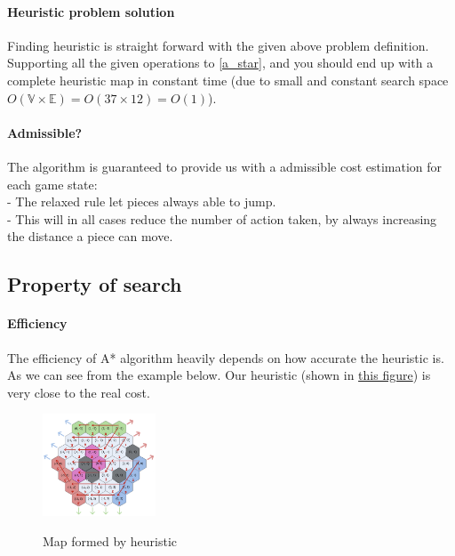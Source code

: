 \documentclass[10.5pt,a4paper]{article}
\begin{document}
        \paragraph{Heuristic problem solution} Finding heuristic is straight forward with the given above problem definition. Supporting all the given operations to \ref{a_star}, and you should end up with a complete heuristic map in constant time (due to small and constant search space $O(\mathbb{V}\times \mathbb{E}) = O(37\times 12)=O(1)$).
        \vspace{-10pt}
        \paragraph{Admissible?} The algorithm is guaranteed to provide us with a admissible cost estimation for each game state:\\
    - The relaxed rule let pieces always able to jump.\\
    - This will in all cases reduce the number of action taken, by always increasing the distance a piece can move.
    \vspace{-10pt}
    \subsection{Property of search}
        \paragraph{Efficiency} The efficiency of A* algorithm heavily depends on how accurate the heuristic is. As we can see from the example below. Our heuristic (shown in \hyperref[fig:heurstics]{this figure}) is very close to the real cost.
        \begin{figure}
            \vspace{-32pt}
                \begin{center}
                    \includegraphics[width=0.3\textwidth]{heuristic.png}
                    \label{fig:heurstics}
                \end{center}
            \vspace{-10pt}
            \caption{Map formed by heuristic}
            \vspace{-100pt}
        \end{figure}
        \vspace{-40pt}
\end{document}
